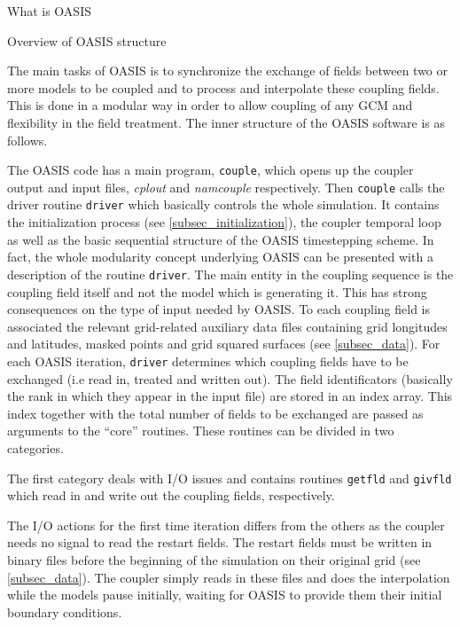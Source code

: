 \newpage
\begin{section}{What is OASIS}%
%
\begin{subsection}{Overview of OASIS structure}
\label{subsec_overview}

The main tasks of OASIS is to synchronize the exchange of fields
between two or more models to be coupled and to process and 
interpolate these coupling fields. This is done in a
modular way in order to allow coupling of any GCM and flexibility in the
field treatment. The inner structure of the OASIS software is as follows.

\vspace{0.4cm}

The OASIS code has a main program, {\tt couple}, which opens up the
coupler output and input files, {\em cplout} and {\em namcouple} respectively.
Then {\tt couple} calls the driver routine {\tt driver} which
basically controls the whole simulation. It contains the initialization 
process (see \ref{subsec_initialization}), the coupler temporal loop as well 
as the basic sequential structure of the OASIS
timestepping scheme. 
In fact, the whole modularity concept underlying OASIS
can be presented with a description of the routine {\tt driver}.
The main entity in the coupling sequence is the coupling field itself 
and not the model which is generating it. This has strong consequences
on the type of input needed by OASIS. To each coupling field is associated
the relevant grid-related auxiliary data files containing grid longitudes and 
latitudes, masked points and grid squared surfaces (see \ref{subsec_data}).
For each OASIS iteration, {\tt driver} determines which coupling fields 
have to be exchanged (i.e read in, treated and written out). The field 
identificators (basically the rank in which they appear in the input file)
are stored in an index array. This index together with the total number of 
fields to be exchanged are passed as arguments to the ``core'' routines. 
These routines can be divided in two categories. 

\vspace{0.4cm}

The first category deals with I/O
issues and contains routines {\tt getfld} and {\tt givfld} which read in
and write out the coupling fields, respectively. 

The I/O actions for the
first time iteration differs from the others as the coupler needs no signal 
to read the restart fields. 
The restart fields must be written in binary files before the beginning of the 
simulation on their
original grid (see \ref{subsec_data}). The coupler simply reads in these files 
and does the interpolation while the models pause initially, waiting for
OASIS to provide them their initial boundary conditions.


\end{subsection}
\end{section}
